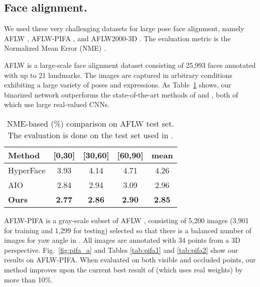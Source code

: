 \documentclass[10pt,journal,compsoc]{IEEEtran}
\begin{document}
\subsection{Face alignment.} We used three very challenging datasets for large pose face alignment, namely AFLW {\cite{kostinger2011annotated}}, AFLW-PIFA {\cite{jourabloo2015pose}}, and AFLW2000-3D {\cite{zhu2016face}}. The evaluation metric is the Normalized Mean Error (NME) {\cite{jourabloo2015pose}.}

AFLW is a large-scale face alignment dataset consisting of 25,993 faces annotated with up to 21 landmarks. The images are captured in arbitrary conditions exhibiting a large variety of poses and expressions. As Table{~\ref{tab:aflw_full_results}} shows, our binarized network outperforms the state-of-the-art methods of \cite{ranjan2016hyperface} and \cite{ranjan2017all}, both of which use large real-valued CNNs.

\begin{table}[!htbp]
    \renewcommand{\arraystretch}{1.3}
    \caption{NME-based (\%) comparison on AFLW test set. The evaluation is done on the test set used in \cite{ranjan2017all}. }
    \label{tab:aflw_full_results}
    \centering
    \begin{tabular}{|l|c|c|c|c|} \hline
        Method                               & [0,30]        & [30,60]       & [60,90]       & mean          \\
        \hline\hline
        HyperFace \cite{ranjan2016hyperface} & 3.93          & 4.14          & 4.71          & 4.26          \\
        \hline
        AIO \cite{ranjan2017all}             & 2.84          & 2.94          & 3.09          & 2.96          \\
        \hline
        \textbf{Ours}                        & \textbf{2.77} & \textbf{2.86} & \textbf{2.90} & \textbf{2.85} \\
        \hline
    \end{tabular}
\end{table}

AFLW-PIFA \cite{jourabloo2015pose} is a gray-scale subset of AFLW \cite{kostinger2011annotated}, consisting of 5,200 images (3,901 for training and 1,299 for testing) selected so that there is a balanced number of images for yaw angle in . All images are annotated with 34 points from a 3D perspective. Fig.~\ref{fig:pifa_a} and Tables \ref{tab:pifa1} and \ref{tab:pifa2} show our results on AFLW-PIFA. When evaluated on both visible and occluded points, our method improves upon the current best result of \cite{bulat2016convolutional} (which uses real weights) by more than 10\%.
\end{document}
